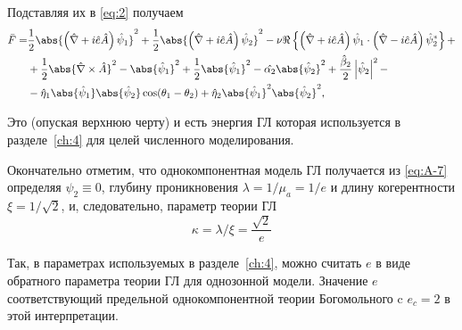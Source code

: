 Подставляя их в \eqref{eq:2} получаем
\begin{align}
  \bar{F} = & \frac{1}{2}\abs{\left( \hat{\nabla} + i\hat{e}\hat{A} \right)
    \hat{\psi}_1}^2 + \frac{1}{2}\abs{\left( \hat{\nabla} + i\hat{e}\hat{A}
    \right)\hat{\psi}_2}^2 - \nu\Re\left\{ \left( \hat{\nabla} + i\hat{e}\hat{A}
    \right) \hat{\psi}_1 \cdot \left( \hat{\nabla} - i\hat{e}\hat{A} \right)
    \hat{\psi}^*_2 \right\} + \nonumber \\
  & + \frac{1}{2}\abs{\hat{\nabla}\times\hat{A}}^2 - \abs{\hat{\psi}_1}^2 +
    \frac{1}{2}\abs{\hat{\psi}_1}^2 - \hat{\alpha_2}\abs{\hat{\psi}_2}^2 +
    \frac{\hat{\beta}_2}{2}\left| \hat{\psi}_2 \right|^2 - \nonumber \\
  & - \hat{\eta}_1\abs{\hat{\psi}_1}\abs{\hat{\psi}_2} \cos(\theta_1 - \theta_2)
    + \hat{\eta}_2\abs{\hat{\psi}_1}^2 \abs{\hat{\psi}_2}^2, \label{eq:A-7}
\end{align}

Это (опуская верхнюю черту) и есть энергия ГЛ которая
используется в разделе~\ref{ch:4} для целей численного моделирования.

Окончательно отметим, что однокомпонентная модель ГЛ получается
из \eqref{eq:A-7} определяя \( \psi_2 \equiv 0 \), глубину проникновения
\( \lambda = 1/\mu_a = 1/e \) и длину когерентности
\( \xi = 1/\sqrt{2} \), и, следовательно, параметр теории ГЛ
\begin{equation}
  \kappa = \lambda/\xi = \frac{\sqrt{2}}{e}
  \label{eq:A-8}
\end{equation}

Так, в параметрах используемых в разделе~\ref{ch:4}, можно считать \( e \) в 
виде обратного параметра теории ГЛ для однозонной модели. Значение \( e \)
соответствующий предельной однокомпонентной теории Богомольного c
\( e_c = 2 \) в этой интерпретации.
